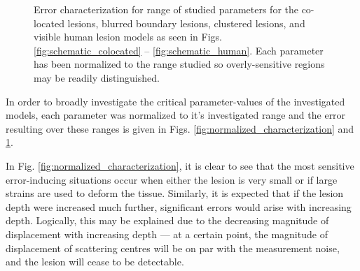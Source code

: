 			\begin{figure}[!t]
				\centering
				\caption[Error characterization for complicated models]{Error characterization for range of studied parameters for the co-located lesions, blurred boundary lesions, clustered lesions, and visible human lesion models as seen in Figs. \ref{fig:schematic_colocated} -- \ref{fig:schematic_human}. Each parameter has been normalized to the range studied so overly-sensitive regions may be readily distinguished.}
				\label{fig:normalized_characterization_extras}
			\end{figure}

			In order to broadly investigate the critical parameter-values of the investigated models, each parameter was normalized to it's investigated range and the error resulting over these ranges is given in Figs. \ref{fig:normalized_characterization} and \ref{fig:normalized_characterization_extras}.

			In Fig. \ref{fig:normalized_characterization}, it is clear to see that the most sensitive error-inducing situations occur when either the lesion is very small or if large strains are used to deform the tissue. Similarly, it is expected that if the lesion depth were increased much further, significant errors would arise with increasing depth. Logically, this may be explained due to the decreasing magnitude of displacement with increasing depth --- at a certain point, the magnitude of displacement of scattering centres will be on par with the measurement noise, and the lesion will cease to be detectable.

